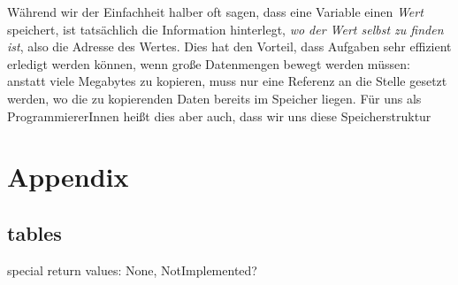 Während wir der Einfachheit halber oft sagen, dass eine Variable einen \emph{Wert} speichert, ist tatsächlich die Information hinterlegt, \emph{wo der Wert selbst zu finden ist}, also die Adresse des Wertes. Dies hat den Vorteil, dass Aufgaben sehr effizient erledigt werden können, wenn große Datenmengen bewegt werden müssen: anstatt viele Megabytes zu kopieren, muss nur eine Referenz an die Stelle gesetzt werden, wo die zu kopierenden Daten bereits im Speicher liegen. Für uns als ProgrammiererInnen heißt dies aber auch, dass wir uns diese Speicherstruktur

\chapter{Appendix}
\section{tables}
special return values: None, NotImplemented?